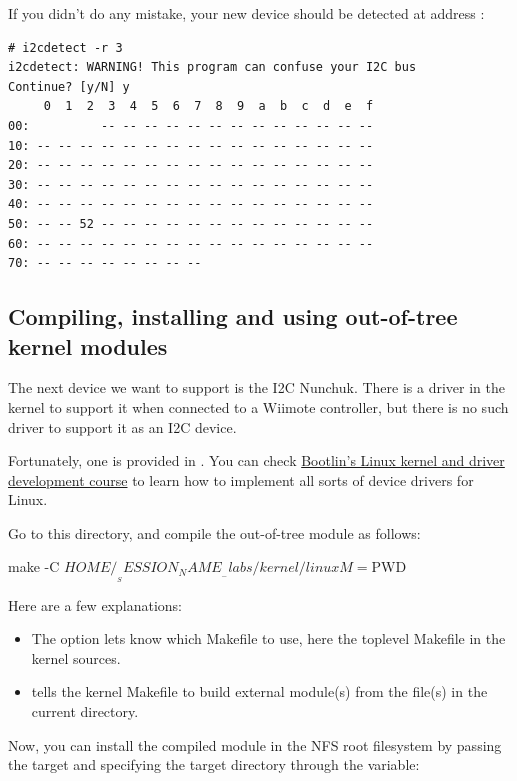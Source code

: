 If you didn't do any mistake, your new device should be detected at
address :

\begin{verbatim}
# i2cdetect -r 3
i2cdetect: WARNING! This program can confuse your I2C bus
Continue? [y/N] y
     0  1  2  3  4  5  6  7  8  9  a  b  c  d  e  f
00:          -- -- -- -- -- -- -- -- -- -- -- -- --
10: -- -- -- -- -- -- -- -- -- -- -- -- -- -- -- --
20: -- -- -- -- -- -- -- -- -- -- -- -- -- -- -- --
30: -- -- -- -- -- -- -- -- -- -- -- -- -- -- -- --
40: -- -- -- -- -- -- -- -- -- -- -- -- -- -- -- --
50: -- -- 52 -- -- -- -- -- -- -- -- -- -- -- -- --
60: -- -- -- -- -- -- -- -- -- -- -- -- -- -- -- --
70: -- -- -- -- -- -- -- --
\end{verbatim}

\subsection{Compiling, installing and using out-of-tree kernel modules}

The next device we want to support is the I2C Nunchuk. There is a driver
in the kernel to support it when connected to a Wiimote controller, but
there is no such driver to support it as an I2C device.

Fortunately, one is provided in
. You can check
\href{https://bootlin.com/training/kernel/}{Bootlin's Linux kernel and
driver development course} to learn how to implement all sorts of device
drivers for Linux.

Go to this directory, and compile the out-of-tree module as follows:

\begin{bashinput}
make -C $HOME/__SESSION_NAME__-labs/kernel/linux M=$PWD
\end{bashinput}

Here are a few explanations:
\begin{itemize}
\item The  option lets  know which Makefile to
      use, here the toplevel Makefile in the kernel sources.
\item {} tells the kernel Makefile to build external
      module(s) from the file(s) in the current directory.
\end{itemize}

Now, you can install the compiled module in the NFS root filesystem
by passing the  target and specifying the
target directory through the  variable:

